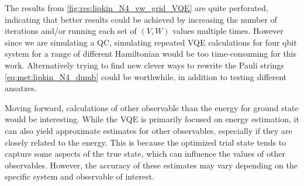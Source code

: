 The results from \cref{fig:res:lipkin_N4_vw_grid_VQE} are quite perforated, indicating that better results could be achieved by increasing the number of iterations and/or running each set of $(V,W)$ values multiple times. However since we are simulating a QC, simulating repeated VQE calculations for four qbit system for a range of different Hamiltonian would be too time-consuming for this work. Alternatively trying to find new clever ways to rewrite the Pauli strings \cref{eq:met:lipkin_N4_dumb} could be worthwhile, in addition to testing different ansatzes.      

Moving forward, calculations of other observable than the energy for ground state would be interesting. While the VQE is primarily focused on energy estimation, it can also yield approximate estimates for other observables, especially if they are closely related to the energy. This is because the optimized trial state tends to capture some aspects of the true state, which can influence the values of other observables. However, the accuracy of these estimates may vary depending on the specific system and observable of interest.
